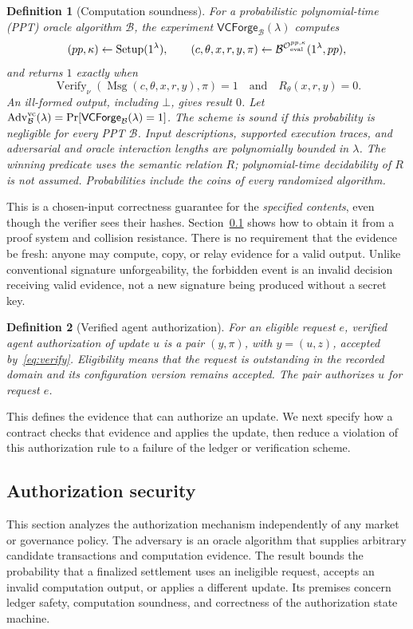 \documentclass[10pt,letterpaper]{article}
\newtheorem{definition}{Definition}
\newcommand{\Verify}{\operatorname{Verify}}
\newcommand{\Msg}{\operatorname{Msg}}
\newcommand{\EvalO}{\mathcal O_{\rm eval}}
\begin{document}
\begin{definition}[Computation soundness]
\label{def:vcsound}
For a probabilistic polynomial-time (PPT) oracle algorithm $\mathcal B$, the experiment $\mathsf{VCForge}_{\mathcal B}(\lambda)$ computes
\[
 (pp,\kappa)\leftarrow\operatorname{Setup}(1^\lambda),\qquad
 (c,\theta,x,r,y,\pi)\leftarrow\mathcal B^{\EvalO^{pp,\kappa}}(1^\lambda,pp),
\]
and returns $1$ exactly when
\begin{equation}
 \Verify_\nu(\Msg(c,\theta,x,r,y),\pi)=1
 \quad\text{and}\quad R_\theta(x,r,y)=0. \label{eq:vcgame}
\end{equation}
An ill-formed output, including $\bot$, gives result $0$. Let $\operatorname{Adv}^{\rm vc}_{\mathcal B}(\lambda)=\Pr[\mathsf{VCForge}_{\mathcal B}(\lambda)=1]$. The scheme is sound if this probability is negligible for every PPT $\mathcal B$. Input descriptions, supported execution traces, and adversarial and oracle interaction lengths are polynomially bounded in $\lambda$. The winning predicate uses the semantic relation $R$; polynomial-time decidability of $R$ is not assumed. Probabilities include the coins of every randomized algorithm.
\end{definition}
This is a chosen-input correctness guarantee for the \emph{specified contents}, even though the verifier sees their hashes. Section~\ref{sec:auth-security} shows how to obtain it from a proof system and collision resistance. There is no requirement that the evidence be fresh: anyone may compute, copy, or relay evidence for a valid output. Unlike conventional signature unforgeability, the forbidden event is an invalid decision receiving valid evidence, not a new signature being produced without a secret key.

\begin{definition}[Verified agent authorization]
\label{def:verified-authorization}
For an eligible request $e$, verified agent authorization of update $u$ is a pair $(y,\pi)$, with $y=(u,z)$, accepted by~\eqref{eq:verify}. Eligibility means that the request is outstanding in the recorded domain and its configuration version remains accepted. The pair authorizes $u$ for request $e$.
\end{definition}
This defines the evidence that can authorize an update. We next specify how a contract checks that evidence and applies the update, then reduce a violation of this authorization rule to a failure of the ledger or verification scheme.

\subsection{Authorization security}
\label{sec:auth-security}
This section analyzes the authorization mechanism independently of any market or governance policy. The adversary is an oracle algorithm that supplies arbitrary candidate transactions and computation evidence. The result bounds the probability that a finalized settlement uses an ineligible request, accepts an invalid computation output, or applies a different update. Its premises concern ledger safety, computation soundness, and correctness of the authorization state machine.
\end{document}

